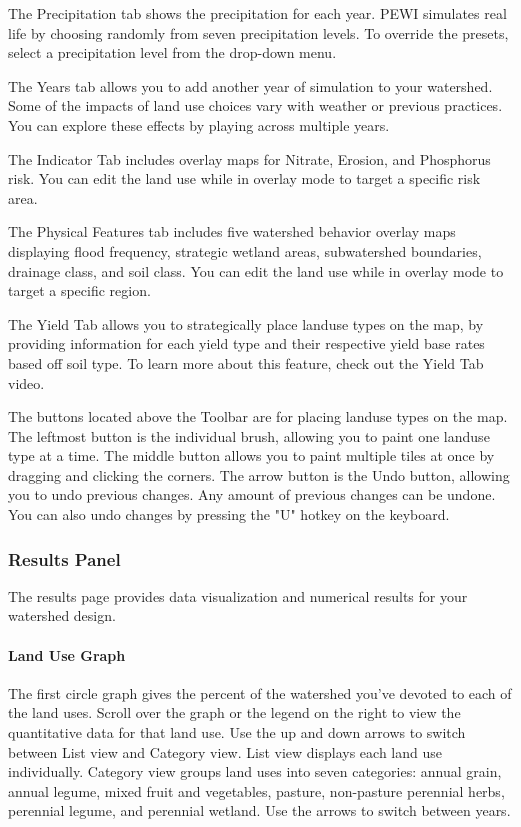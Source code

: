 \documentclass[11pt]{article}
\begin{document}
\begin{itemize}
The Precipitation tab shows the precipitation for each year. PEWI simulates real life by choosing randomly from seven precipitation levels. To override the presets, select a precipitation level from the drop-down menu.

The Years tab allows you to add another year of simulation to your watershed. Some of the impacts of land use choices vary with weather or previous practices. You can explore these effects by playing across multiple years.

The Indicator Tab includes overlay maps for Nitrate, Erosion, and Phosphorus risk. You can edit the land use while in overlay mode to target a specific risk area.

The Physical Features tab includes five watershed behavior overlay maps displaying flood frequency, strategic wetland areas, subwatershed boundaries, drainage class, and soil class. You can edit the land use while in overlay mode to target a specific region.

The Yield Tab allows you to strategically place landuse types on the map, by providing information for each yield type and their respective yield base rates based off soil type. To learn more about this feature, check out the Yield Tab video.

The buttons located above the Toolbar are for placing landuse types on the map. The leftmost button is the individual brush, allowing you to paint one landuse type at a time. The middle button allows you to paint multiple tiles at once by dragging and clicking the corners. The arrow button is the Undo button, allowing you to undo previous changes. Any amount of previous changes can be undone. You can also undo changes by pressing the "U" hotkey on the keyboard. 

\subsubsection{Results Panel}
The results page provides data visualization and numerical results for your watershed design.

\paragraph{Land Use Graph}
The first circle graph gives the percent of the watershed you’ve devoted to each of the land uses. Scroll over the graph or the legend on the right to view the quantitative data for that land use. Use the up and down arrows to switch between List view and Category view. List view displays each land use individually. Category view groups land uses into seven categories: annual grain, annual legume, mixed fruit and vegetables, pasture, non-pasture perennial herbs, perennial legume, and perennial wetland. Use the arrows to switch between years. 


\end{itemize}
\end{document}
